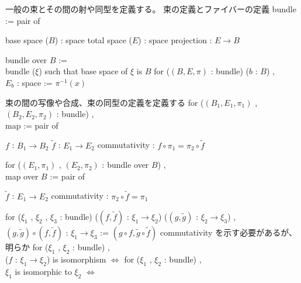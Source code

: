 \begin{Definition}
\itemnote
  一般の束とその間の射や同型を定義する。
\itemnote
  束の定義とファイバーの定義
\itemdefi
  bundle := pair of
  \begin{itemize}
    \itemenum base space (\(B\)) : space
    \itemenum total space (\(E\)) : space
    \itemenum projection : \(E \to B\)
  \end{itemize}
\itemdefi
    bundle over \(B\) := \\
    bundle (\(\xi\)) such that base space of \(\xi\) is \(B\)
\itemdefi
  for (\((B , E , \pi)\) : bundle) (\(b\) : \(B\)) ,\\
  \(E_b\) : space := \(\pi^{-1}(x)\)
\end{Definition}

\begin{Definition}
\itemnote
  束の間の写像や合成、束の同型の定義を定義する
\itemdefi
  for (\((B_1 , E_1 , \pi_1)\) , \((B_2 , E_2 , \pi_2)\) : bundle) ,\\
  map := pair of
  \begin{itemize}
    \itemenum \(f\) : \(B_1 \to B_2\)
    \itemenum \(\tilde{f}\) : \(E_1 \to E_2\)
    \itemwith commutativity : \(f \circ \pi_1 = \pi_2 \circ \tilde{f}\)
  \end{itemize}
\itemdefi
  for (\((E_1 , \pi_1)\) , \((E_2 , \pi_2)\) : bundle over \(B\)) ,\\
  map over \(B\) := pair of
  \begin{itemize}
    \itemenum \(\tilde{f}\) : \(E_1 \to E_2\)
    \itemenum commutativity : \(\pi_2 \circ \tilde{f} = \pi_1\)
  \end{itemize}
\itemdefi
  for (\(\xi_1\) , \(\xi_2\) , \(\xi_3\) : bundle) (\((f , \tilde{f})\) : \(\xi_1 \to \xi_2\)) (\((g , \tilde{g})\) : \(\xi_2 \to \xi_3\)) ,\\
  \((g , \tilde{g}) \circ (f , \tilde{f})\) : \(\xi_1 \to \xi_3\) := \((g \circ f , \tilde{g} \circ \tilde{f})\)
\itemprof
  commutativity を示す必要があるが、明らか
\itemdefi
  for (\(\xi_1\) , \(\xi_2\) : bundle) ,\\
  (\(f\) : \(\xi_1 \to \xi_2\)) is isomorphism \(\iff\) 
\itemdefi
  for (\(\xi_1\) , \(\xi_2\) : bundle) ,\\
  \(\xi_1\) is isomorphic to \(\xi_2\) \(\iff\) 
\end{Definition}


